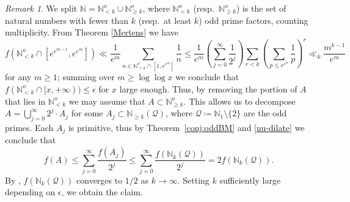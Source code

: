 \documentclass[12pt]{amsart}
\theoremstyle{definition}
\theoremstyle{remark}
\newtheorem{remark}[theorem]{Remark}
\numberwithin{equation}{section}
\newcommand{\N}{{\mathbb N}}
\newcommand{\1}{{\mathbf 1}}
\newcommand{\eps}{{\epsilon}}
\begin{document}
\begin{remark}
We split $\N = \N_{<k}^o \cup \N_{\geq k}^o$, where $\N_{< k}^o$ (resp.~$\N_{\geq k}^o$) is the set of natural numbers with fewer than $k$ (resp.~at least $k$) odd prime factors, counting multiplicity.  From Theorem \ref{Mertens} we have
$$ f(\N_{<k}^o \cap [e^{e^{m-1}},e^{e^m}]) \ll \frac{1}{e^m} \sum_{n \in \N_{<k}^o \cap [1,e^{e^m}]} \frac{1}{n} \leq \frac{1}{e^m} \left( \sum_{j=0}^\infty \frac{1}{2^j} \right) \sum_{r<k} \left( \sum_{p \leq e^{e^m}} \frac{1}{p} \right)^r \ll_k \frac{m^{k-1}}{e^m}$$
for any $m \geq 1$; summing over $m \geq \log\log x$ we conclude that $f(\N_{<k}^o \cap [x,+\infty)) \leq \eps$ for $x$ large enough.  Thus, by removing the portion of $A$ that lies in $\N_{<k}^o$ we may assume that $A \subset \N_{\geq k}^o$.  This allows us to decompose $A = \bigcup_{j=0}^\infty 2^j \cdot A_j$ for some $A_j \subset \N_{\geq k}(\mathcal{Q})$, where $\mathcal{Q} \coloneq \N_1 \setminus \{2\}$ are the odd primes.  Each $A_j$ is primitive, thus by Theorem~\ref{conj:oddBM} and \eqref{nu-dilate} we conclude that
$$ f(A) \leq \sum_{j=0}^\infty \frac{f(A_j)}{2^j} \leq \sum_{j=0}^\infty \frac{f(\N_k(\mathcal{Q}))}{2^j} = 2 f(\N_k(\mathcal{Q})).$$
By \cite[Corollary~4.2]{Lalmost}, $f(\N_k(\mathcal{Q}))$ converges to $1/2$ as $k \to \infty$.  Setting $k$ sufficiently large depending on $\eps$, we obtain the claim.
\end{remark}
\end{document}

